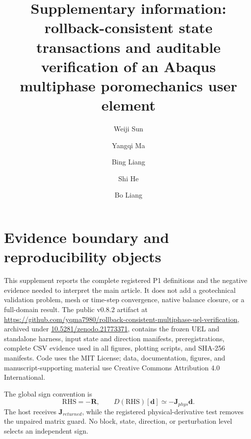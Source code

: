 \documentclass[preprint,12pt,authoryear]{elsarticle}
\begin{document}
\begin{frontmatter}
\title{Supplementary information: rollback-consistent state transactions and auditable verification of an Abaqus multiphase poromechanics user element}
\author[aff1]{Weiji Sun}
\author[aff1]{Yangqi Ma}
\author[aff1]{Bing Liang}
\author[aff2]{Shi He}
\author[aff1]{Bo Liang}
\end{frontmatter}

\section{Evidence boundary and reproducibility objects}

This supplement reports the complete registered P1 definitions and the negative evidence needed to interpret the main article. It does not add a geotechnical validation problem, mesh or time-step convergence, native balance closure, or a full-domain result. The public v0.8.2 artifact at \url{https://github.com/yqma7980/rollback-consistent-multiphase-uel-verification}, archived under \href{https://doi.org/10.5281/zenodo.21773371}{10.5281/zenodo.21773371}, contains the frozen UEL and standalone harness, input state and direction manifests, preregistrations, complete CSV evidence used in all figures, plotting scripts, and SHA-256 manifests. Code uses the MIT License; data, documentation, figures, and manuscript-supporting material use Creative Commons Attribution 4.0 International.

The global sign convention is
\begin{equation}
\mathrm{RHS}=-\mathbf{R},\qquad
D(\mathrm{RHS})[\mathbf d]\simeq-\mathbf J_{phys}\mathbf d.
\end{equation}
The host receives $\mathbf J_{returned}$, while the registered physical-derivative test removes the unpaired matrix guard. No block, state, direction, or perturbation level selects an independent sign.
\end{document}
